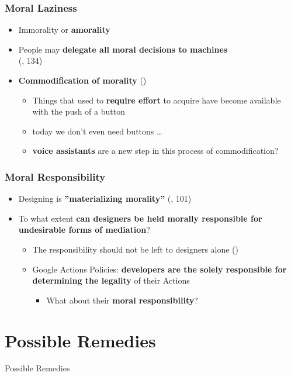 \documentclass{beamer}
\begin{document}
\begin{frame}
\frametitle{Moral Laziness}
\begin{itemize}
	\item Immorality or \textbf{amorality}
	\medskip
	\item People may \textbf{delegate all moral decisions to machines} \\(\cite{verbeek2011moralizing}, 134)
	\medskip
	\item \textbf{Commodification of morality} (\cite{borgmann1984technology})
		 \begin{itemize}
		 	\item Things that used to \textbf{require effort} to acquire have become
		 	available with the push of a button
		 	\smallskip
		 	\item today we don't even need buttons \dots
		 	\smallskip
		 	\item \textbf{voice assistants} are a new step in this process of commodification?
		 \end{itemize}
\end{itemize}
\end{frame}

\begin{frame}
	\frametitle{Moral Responsibility}
	\begin{itemize}
		\item Designing is \textbf{''materializing morality''} (\cite{verbeek2011moralizing}, 101)
		\bigskip
		\item To what extent \textbf{can designers be held morally responsible for undesirable forms of mediation}?
		\smallskip
		\begin{itemize}
			\item The responsibility should not be left to designers alone (\cite{verbeek2011moralizing})
			\medskip
			\item Google Actions Policies: \textbf{developers are the solely responsible for determining the legality} of their Actions
			\smallskip
			\begin{itemize}
				\item What about their \textbf{moral responsibility}?
			\end{itemize}
		\end{itemize}
	\end{itemize}
\end{frame}

\section{Possible Remedies}
\begin{frame}
\begin{center} 
	 Possible Remedies
\end{center}
\end{frame}
\end{document}
